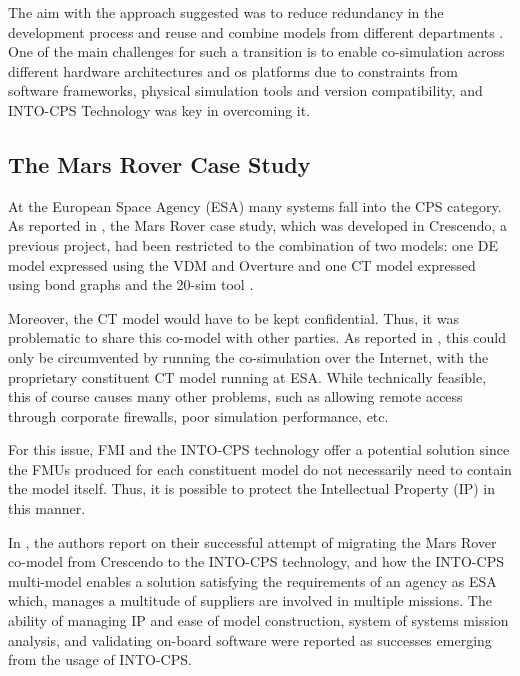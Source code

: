 The aim with the approach suggested was to reduce redundancy in the
development process and reuse and combine models from different
departments \cite{Pedersen&17}. One of the main challenges for such a transition
is to enable co-simulation across different hardware architectures and \ac{os}
platforms due to constraints from software frameworks, physical simulation
tools and version compatibility, and INTO-CPS Technology was key in overcoming
it.

\subsection{The Mars Rover Case Study}


At the European Space Agency (ESA) many systems fall into the CPS category.  As
reported in \cite{Feo-Arenis&17}, the Mars Rover case study, which was
developed in Crescendo, a previous project, had been restricted to the
combination of two models:  one DE model expressed using the
VDM \cite{Fitzgerald&08c} and Overture 
\cite{Larsen&10a} and one CT model expressed using bond graphs
\cite{Karnopp&68} and the 20-sim tool \cite{Kleijn06}.

Moreover, the CT model would have to be kept confidential.  Thus, it was
problematic to share this co-model with other parties.  As reported in
\cite{Feo-Arenis&17}, this could only be circumvented by running the
co-simulation over the Internet, with the proprietary constituent CT model
running at ESA. While technically feasible, this of course causes many other
problems, such as allowing remote access through corporate firewalls, poor
simulation performance, etc.

For this issue, FMI and the INTO-CPS technology offer a potential solution since
the FMUs produced for each constituent model do not
necessarily need to contain the model itself. Thus, it is possible to protect
the Intellectual Property (IP) in this manner.

In \cite{Feo-Arenis&17}, the authors report on their successful attempt of
migrating the Mars Rover co-model from Crescendo to the INTO-CPS technology,
and how the INTO-CPS multi-model enables a solution satisfying the requirements of
an agency as ESA which, manages a multitude of suppliers are involved in
multiple  missions. The ability of managing IP and ease of model
construction, system of systems mission analysis, and validating on-board
software were reported as successes emerging from the usage of INTO-CPS.


